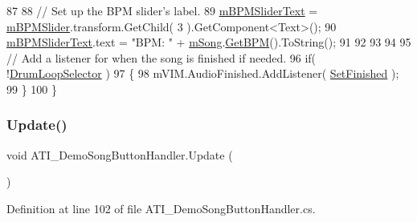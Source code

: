 \begin{DoxyCode}
87 
88         \textcolor{comment}{// Set up the BPM slider's label.}
89         \hyperlink{class_a_t_i___demo_song_button_handler_af884aa63036769a78f92d86084156263}{mBPMSliderText} = \hyperlink{class_a_t_i___demo_song_button_handler_a7d1ed48ed81d7fc9fbde52f8ee87600e}{mBPMSlider}.transform.GetChild( 3 ).GetComponent<Text>();
90         \hyperlink{class_a_t_i___demo_song_button_handler_af884aa63036769a78f92d86084156263}{mBPMSliderText}.text = \textcolor{stringliteral}{"BPM: "} + \hyperlink{class_a_t_i___demo_song_button_handler_aef782d481c6250a9062162c71298ed8f}{mSong}.\hyperlink{group___song_pub_func_gaaaf3d27d474713d7d368e3fd4c570be0}{GetBPM}().ToString();
91 
92 
93         
94 
95         \textcolor{comment}{// Add a listener for when the song is finished if needed.}
96         \textcolor{keywordflow}{if}( !\hyperlink{class_a_t_i___demo_song_button_handler_a772b617c22a316a99f3a4b6979d0657a}{DrumLoopSelector} )
97         \{
98             mVIM.AudioFinished.AddListener( \hyperlink{class_a_t_i___demo_song_button_handler_aec5406e1eb0c885f0e6fe044cfe4113e}{SetFinished} );
99         \}
100     \}
\end{DoxyCode}
\mbox{\label{class_a_t_i___demo_song_button_handler_a27b2b6ae2ef7d38ba4212bc4ad280247}} 
\subsubsection{\texorpdfstring{Update()}{Update()}}
{\footnotesize\ttfamily void A\+T\+I\+\_\+\+Demo\+Song\+Button\+Handler.\+Update (\begin{DoxyParamCaption}{ }\end{DoxyParamCaption})\hspace{0.3cm}{\ttfamily [private]}}



Definition at line 102 of file A\+T\+I\+\_\+\+Demo\+Song\+Button\+Handler.\+cs.



